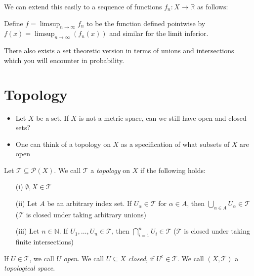 \documentclass [aspectratio=169]{beamer}
\newcommand{\R}{{\mathbb{R}}}
\newcommand{\N}{{\mathbb{N}}}
\newcommand{\cP}{\mathcal{P}}
\newcommand{\cT}{\mathcal{T}}
\begin{document}
\begin{frame}
\vspace{2em}
We can extend this easily to a sequence of functions $f_n \colon X \to \R$ as follows:
\vspace{0.5em}

Define $f = \limsup_{n\to \infty } f_n$ to be the function defined pointwise by $f(x) = \limsup_{n\to \infty } (f_n (x)) $ and similar for the limit inferior. 

\vspace{1em}

There also exists a set theoretic version in terms of unions and intersections which you will encounter in probability.

\end{frame}


\section{Topology}

\begin{frame}
\begin{itemize}
\item Let $X$ be a set. If $X$ is not a metric space, can we still have open and closed sets?
\item One can think of a topology on $X$ as a specification of what subsets of $X$ are open
\end{itemize}

\vspace{0.5em}

\begin{definition}
Let $\cT\subseteq \cP(X)$. We call $\cT$ a \emph{topology} on $X$ if the following holds:
\begin{itemize}
    \item[(i)] $\emptyset, X \in \cT$
    \item[(ii)] Let $A$ be an arbitrary index set. If $U_\alpha \in \cT$ for $\alpha\in A$, then $\bigcup_{\alpha \in A} U_\alpha \in \cT$ ($\cT$ is closed under taking arbitrary unions)
    \item[(iii)] Let $n \in \N$. If $U_1, \ldots, U_n \in \cT$, then $\bigcap_{i=1}^n U_i \in \cT$ ($\cT$ is closed under taking finite intersections)
\end{itemize}
If $U\in \cT$, we call $U$ \emph{open}. We call $U\subseteq X$ \emph{closed}, if $U^c\in \cT$. We call $(X,\cT)$ a \emph{topological space}.
\end{definition}

\end{frame}
\end{document}
